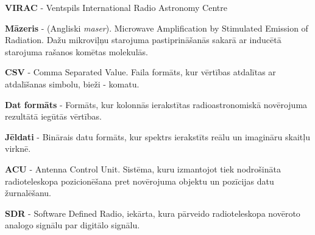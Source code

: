 \documentclass[12pt,paper=a4]{report}
\begin{document}
\textbf{VIRAC} - Ventspils International Radio Astronomy Centre

\textbf{Māzeris} - (Angliski \textit{maser}). Microwave Amplification by Stimulated Emission of Radiation. Dažu mikroviļņu starojuma pastiprināšanās sakarā ar inducētā starojuma rašanos komētas molekulās.


\textbf{CSV} - Comma Separated Value. Faila formāts, kur vērtības atdalītas ar atdalīšanas simbolu, bieži - komatu.

\textbf{Dat formāts} - Formāts, kur kolonnās ierakstītas radioastronomiskā novērojuma rezultātā iegūtās vērtības. 

\textbf{Jēldati} - Binārais datu formāts, kur spektrs ierakstīts reālu un imagināru skaitļu virknē.


\textbf{ACU} - Antenna Control Unit. Sistēma, kuru izmantojot tiek nodrošināta radioteleskopa pozicionēšana pret novērojuma objektu un pozīcijas datu žurnalēšanu.

\textbf{SDR} - Software Defined Radio, iekārta, kura pārveido radioteleskopa novēroto analogo signālu par digitālo signālu.







\end{document}

